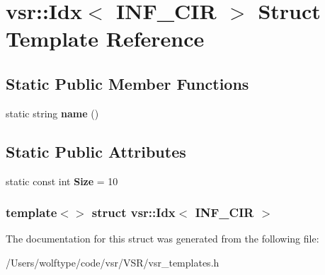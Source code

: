 \hypertarget{structvsr_1_1_idx_3_01_i_n_f___c_i_r_01_4}{\section{vsr\-:\-:Idx$<$ I\-N\-F\-\_\-\-C\-I\-R $>$ Struct Template Reference}
\label{structvsr_1_1_idx_3_01_i_n_f___c_i_r_01_4}
}
\subsection*{Static Public Member Functions}
\begin{DoxyCompactItemize}
\item 
\hypertarget{structvsr_1_1_idx_3_01_i_n_f___c_i_r_01_4_a549f69a9456b6049f196fe5946dd864d}{static string {\bfseries name} ()}\label{structvsr_1_1_idx_3_01_i_n_f___c_i_r_01_4_a549f69a9456b6049f196fe5946dd864d}

\end{DoxyCompactItemize}
\subsection*{Static Public Attributes}
\begin{DoxyCompactItemize}
\item 
\hypertarget{structvsr_1_1_idx_3_01_i_n_f___c_i_r_01_4_a17db7f1387cd54cece4d51002cb60d24}{static const int {\bfseries Size} = 10}\label{structvsr_1_1_idx_3_01_i_n_f___c_i_r_01_4_a17db7f1387cd54cece4d51002cb60d24}

\end{DoxyCompactItemize}
\subsubsection*{template$<$$>$ struct vsr\-::\-Idx$<$ I\-N\-F\-\_\-\-C\-I\-R $>$}



The documentation for this struct was generated from the following file\-:\begin{DoxyCompactItemize}
\item 
/\-Users/wolftype/code/vsr/\-V\-S\-R/vsr\-\_\-templates.\-h\end{DoxyCompactItemize}
